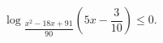 \begin{ex}[type=inequality]
	\begin{condition}
		$ \log$\tiny$_{\dfrac{x^2 - 18x + 91}{90}}$\normalsize$\left(5x - \dfrac{3}{10}\right) \leqslant0.$
	\end{condition}
\end{ex}